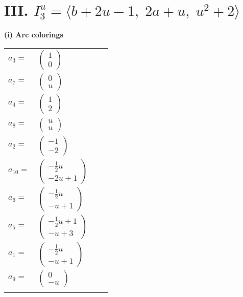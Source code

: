 \documentclass[1p]{elsarticle_modified}
\theoremstyle{definition}
\begin{document}
\centering \section*{III. $I^u_{3}= \langle b+2 u-1,\;2 a+u,\;u^2+2 \rangle$}
\flushleft \textbf{(i) Arc colorings}\\
\begin{tabular}{m{7pt} m{180pt} m{7pt} m{180pt} }
\flushright $a_{3}=$&$\begin{pmatrix}1\\0\end{pmatrix}$ \\
\flushright $a_{7}=$&$\begin{pmatrix}0\\u\end{pmatrix}$ \\
\flushright $a_{4}=$&$\begin{pmatrix}1\\2\end{pmatrix}$ \\
\flushright $a_{8}=$&$\begin{pmatrix}u\\u\end{pmatrix}$ \\
\flushright $a_{2}=$&$\begin{pmatrix}-1\\-2\end{pmatrix}$ \\
\flushright $a_{10}=$&$\begin{pmatrix}-\frac{1}{2} u\\-2 u+1\end{pmatrix}$ \\
\flushright $a_{6}=$&$\begin{pmatrix}-\frac{1}{2} u\\- u+1\end{pmatrix}$ \\
\flushright $a_{5}=$&$\begin{pmatrix}-\frac{1}{2} u+1\\- u+3\end{pmatrix}$ \\
\flushright $a_{1}=$&$\begin{pmatrix}-\frac{1}{2} u\\- u+1\end{pmatrix}$ \\
\flushright $a_{9}=$&$\begin{pmatrix}0\\- u\end{pmatrix}$\\&\end{tabular}
\end{document}
